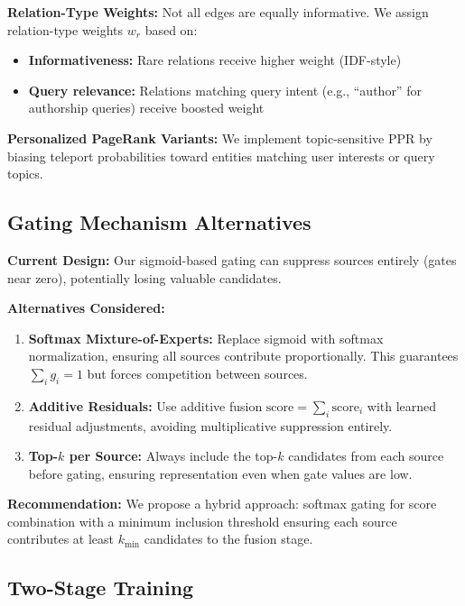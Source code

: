 \documentclass[11pt,a4paper]{article}
\begin{document}
\textbf{Relation-Type Weights:} Not all edges are equally informative. We assign relation-type weights $w_r$ based on:
\begin{itemize}
    \item \textbf{Informativeness:} Rare relations receive higher weight (IDF-style)
    \item \textbf{Query relevance:} Relations matching query intent (e.g., ``author'' for authorship queries) receive boosted weight
\end{itemize}

\textbf{Personalized PageRank Variants:} We implement topic-sensitive PPR \citep{haveliwala2003topic} by biasing teleport probabilities toward entities matching user interests or query topics.

\subsection{Gating Mechanism Alternatives}
\label{sec:gating_alternatives}

\textbf{Current Design:} Our sigmoid-based gating can suppress sources entirely (gates near zero), potentially losing valuable candidates.

\textbf{Alternatives Considered:}
\begin{enumerate}
    \item \textbf{Softmax Mixture-of-Experts:} Replace sigmoid with softmax normalization, ensuring all sources contribute proportionally. This guarantees $\sum_i g_i = 1$ but forces competition between sources.
    
    \item \textbf{Additive Residuals:} Use additive fusion $\text{score} = \sum_i \text{score}_i$ with learned residual adjustments, avoiding multiplicative suppression entirely.
    
    \item \textbf{Top-$k$ per Source:} Always include the top-$k$ candidates from each source before gating, ensuring representation even when gate values are low.
\end{enumerate}

\textbf{Recommendation:} We propose a hybrid approach: softmax gating for score combination with a minimum inclusion threshold ensuring each source contributes at least $k_{\min}$ candidates to the fusion stage.

\subsection{Two-Stage Training}
\label{sec:training}
\end{document}
